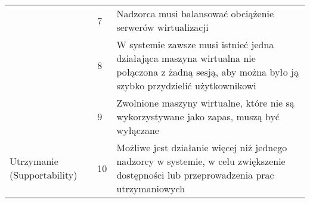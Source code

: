 \documentclass[../wstep.tex]{subfiles}
\begin{document}
\begin{table}[H]
\begin{tabular}{|p{}|p{}|p{}|}
                                                        & 7            & Nadzorca musi balansować obciążenie serwerów wirtualizacji                                                                                                                                                                 \\ \cline{2-3}
                                                        & 8            & W systemie zawsze musi istnieć jedna działająca maszyna wirtualna nie połączona z żadną sesją, aby można było ją szybko przydzielić użytkownikowi                                                                          \\ \cline{2-3}
                                                        & 9            & Zwolnione maszyny wirtualne, które nie są wykorzystywane jako zapas, muszą być wyłączane                                                                                                                                   \\ \hline
        \multirow[t]{3}{=}{Utrzymanie (Supportability)} & 10           & Możliwe jest działanie więcej niż jednego nadzorcy w systemie, w celu zwiększenie dostępności lub przeprowadzenia prac utrzymaniowych                                                                                      \\
        \hline
    \end{tabular}
\end{table}
\end{document}
